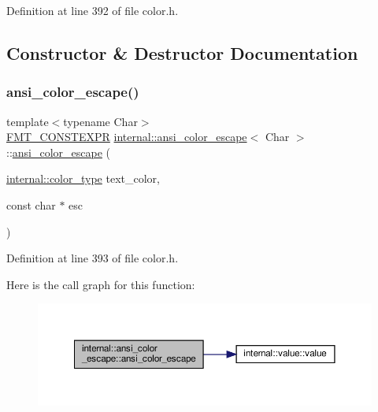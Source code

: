 Definition at line 392 of file color.\+h.



\subsection{Constructor \& Destructor Documentation}
\mbox{\label{structinternal_1_1ansi__color__escape_ae3bd35bc9fb7e4f6bcf14b01d863d608}} 
\subsubsection{\texorpdfstring{ansi\+\_\+color\+\_\+escape()}{ansi\_color\_escape()}\hspace{0.1cm}{\footnotesize\ttfamily [1/2]}}
{\footnotesize\ttfamily template$<$typename Char$>$ \\
\hyperlink{core_8h_a69201cb276383873487bf68b4ef8b4cd}{F\+M\+T\+\_\+\+C\+O\+N\+S\+T\+E\+X\+PR} \hyperlink{structinternal_1_1ansi__color__escape}{internal\+::ansi\+\_\+color\+\_\+escape}$<$ Char $>$\+::\hyperlink{structinternal_1_1ansi__color__escape}{ansi\+\_\+color\+\_\+escape} (\begin{DoxyParamCaption}\item[{\hyperlink{structinternal_1_1color__type}{internal\+::color\+\_\+type}}]{text\+\_\+color,  }\item[{const char $\ast$}]{esc }\end{DoxyParamCaption})\hspace{0.3cm}{\ttfamily [inline]}}



Definition at line 393 of file color.\+h.

Here is the call graph for this function\+:
\nopagebreak
\begin{figure}[H]
\begin{center}
\leavevmode
\includegraphics[width=350pt]{structinternal_1_1ansi__color__escape_ae3bd35bc9fb7e4f6bcf14b01d863d608_cgraph}
\end{center}
\end{figure}
\mbox{\label{structinternal_1_1ansi__color__escape_a3e6165e4bdf4e0b65fcba754c6fb4c49}} 
